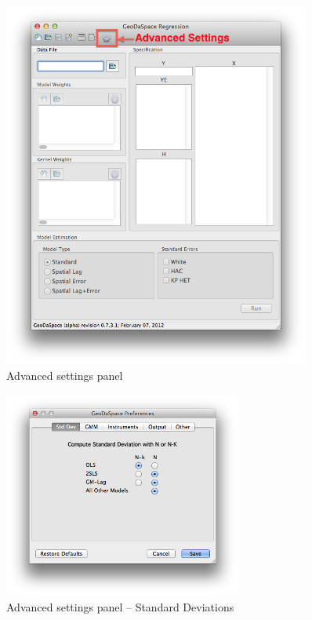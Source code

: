 \documentclass{article}
\begin{document}
\begin{figure}[htb]
\centering
\includegraphics[width=0.9\textwidth]{GUI_adv.png}
\caption{Advanced settings panel}
\label{f:gui_adv}
\end{figure}
\FloatBarrier

\begin{figure}[htb]
\centering
\includegraphics[width=0.7\textwidth]{adv_std.png}
\caption{Advanced settings panel -- Standard Deviations}
\label{f:adv_std}
\end{figure}
\end{document}
